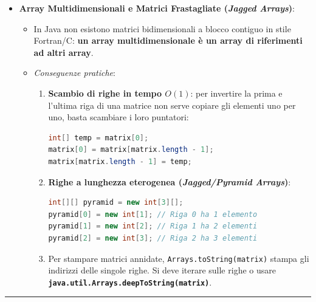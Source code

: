 \documentclass[11pt,a4paper,oneside]{report}
\newcommand{\passthrough}[1]{#1}
\providecommand{\tightlist}{\setlength{\itemsep}{0pt}\setlength{\parskip}{0pt}}
\begin{document}
\begin{itemize}
\begin{lstlisting}[language=Java]
for (String arg : args) {
    System.out.println(arg);
}
\end{lstlisting}

  Sostituisce il for contatore eliminando il rischio di errori di
  \emph{off-by-one} e \emph{ArrayIndexOutOfBoundsException}.
\item
  \textbf{Array Multidimensionali e Matrici Frastagliate (\emph{Jagged
  Arrays})}:

  \begin{itemize}
  \tightlist
  \item
    In Java non esistono matrici bidimensionali a blocco contiguo in
    stile Fortran/C: \textbf{un array multidimensionale è un array di
    riferimenti ad altri array}.
  \item
    \emph{Conseguenze pratiche}:

    \begin{enumerate}
    \def\labelenumi{\arabic{enumi}.}
    \item
      \textbf{Scambio di righe in tempo \(O(1)\)}: per invertire la
      prima e l'ultima riga di una matrice non serve copiare gli
      elementi uno per uno, basta scambiare i loro puntatori:

\begin{lstlisting}[language=Java]
int[] temp = matrix[0];
matrix[0] = matrix[matrix.length - 1];
matrix[matrix.length - 1] = temp;
\end{lstlisting}
    \item
      \textbf{Righe a lunghezza eterogenea (\emph{Jagged/Pyramid
      Arrays})}:

\begin{lstlisting}[language=Java]
int[][] pyramid = new int[3][];
pyramid[0] = new int[1]; // Riga 0 ha 1 elemento
pyramid[1] = new int[2]; // Riga 1 ha 2 elementi
pyramid[2] = new int[3]; // Riga 2 ha 3 elementi
\end{lstlisting}
    \item
      Per stampare matrici annidate,
      \passthrough{\lstinline!Arrays.toString(matrix)!} stampa gli
      indirizzi delle singole righe. Si deve iterare sulle righe o usare
      \textbf{\passthrough{\lstinline!java.util.Arrays.deepToString(matrix)!}}.
    \end{enumerate}
  \end{itemize}
\end{itemize}

\begin{center}\rule{0.5\linewidth}{0.5pt}\end{center}
\end{document}
